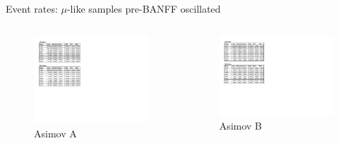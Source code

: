\documentclass{beamer}
\begin{document}
\begin{frame}{Event rates: $\mu$-like samples pre-BANFF oscillated}
	\centering

	\begin{columns}
		\begin{column}{0.5\paperwidth}
			\begin{figure}
				\includegraphics[page=1, trim={0cm 9cm 13cm 1cm}, clip, scale=0.52] {images/rates/prefit_A}
				\caption{Asimov A}
			\end{figure}
		\end{column}
		\begin{column}{0.5\paperwidth}
			\begin{figure}
				\includegraphics[page=1, trim={0cm 8.4cm 13cm 1cm}, clip, scale=0.52] {images/rates/prefit_B}
				\caption{Asimov B}
			\end{figure}
		\end{column}
	\end{columns}
\end{frame}
\end{document}
